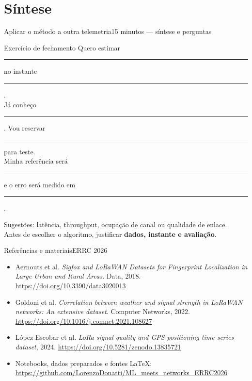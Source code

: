 \section{Síntese}
\begin{frame}{Aplicar o método a outra telemetria}{15 minutos — síntese e perguntas}
\begin{block}{Exercício de fechamento}
Quero estimar \rule{2cm}{.3pt} no instante \rule{2cm}{.3pt}.\\[3mm]
Já conheço \rule{3cm}{.3pt}. Vou reservar \rule{3cm}{.3pt} para teste.\\[3mm]
Minha referência será \rule{2cm}{.3pt} e o erro será medido em \rule{2cm}{.3pt}.
\end{block}
Sugestões: latência, throughput, ocupação de canal ou qualidade de enlace.\\[3mm]
Antes de escolher o algoritmo, justificar \textbf{dados, instante e avaliação}.
\end{frame}

\begin{frame}{Referências e materiais}{ERRC 2026}
\footnotesize
\begin{itemize}
\item Aernouts et al. \emph{Sigfox and LoRaWAN Datasets for Fingerprint Localization in Large Urban and Rural Areas}. Data, 2018. \url{https://doi.org/10.3390/data3020013}
\item Goldoni et al. \emph{Correlation between weather and signal strength in LoRaWAN networks: An extensive dataset}. Computer Networks, 2022. \url{https://doi.org/10.1016/j.comnet.2021.108627}
\item López Escobar et al. \emph{LoRa signal quality and GPS positioning time series dataset}, 2024. \url{https://doi.org/10.5281/zenodo.13835721}
\item Notebooks, dados preparados e fontes LaTeX:\\
\url{https://github.com/LorenzoDonatti/ML_meets_networks_ERRC2026}
\end{itemize}
\end{frame}
